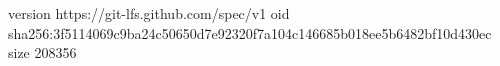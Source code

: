 version https://git-lfs.github.com/spec/v1
oid sha256:3f5114069c9ba24c50650d7e92320f7a104c146685b018ee5b6482bf10d430ec
size 208356
